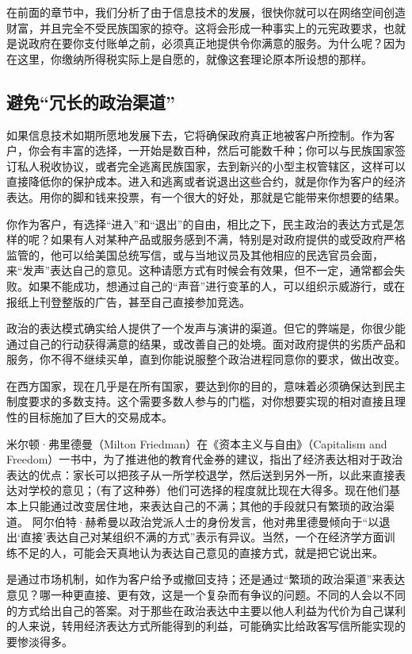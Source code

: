 在前面的章节中，我们分析了由于信息技术的发展，很快你就可以在网络空间创造财富，并且完全不受民族国家的掠夺。这将会形成一种事实上的元宪政要求，也就是说政府在要你支付账单之前，必须真正地提供令你满意的服务。为什么呢？因为在这里，你缴纳所得税实际上是自愿的，就像这套理论原本所设想的那样。

\subsection{避免“冗长的政治渠道”}
如果信息技术如期所愿地发展下去，它将确保政府真正地被客户所控制。作为客户，你会有丰富的选择，一开始是数百种，然后可能数千种；你可以与民族国家签订私人税收协议，或者完全逃离民族国家，去到新兴的小型主权管辖区，这样可以直接降低你的保护成本。进入和逃离或者说退出这些合约，就是你作为客户的经济表达。用你的脚和钱来投票，有一个很大的好处，那就是它能带来你想要的结果。

你作为客户，有选择“进入”和“退出”的自由，相比之下，民主政治的表达方式是怎样的呢？如果有人对某种产品或服务感到不满，特别是对政府提供的或受政府严格监管的，他可以给美国总统写信，或与当地议员及其他相应的民选官员会面，来“发声”表达自己的意见。这种请愿方式有时候会有效果，但不一定，通常都会失败。如果不能成功，想通过自己的“声音”进行变革的人，可以组织示威游行，或在报纸上刊登整版的广告，甚至自己直接参加竞选。

政治的表达模式确实给人提供了一个发声与演讲的渠道。但它的弊端是，你很少能通过自己的行动获得满意的结果，或改善自己的处境。面对政府提供的劣质产品和服务，你不得不继续买单，直到你能说服整个政治进程同意你的要求，做出改变。

在西方国家，现在几乎是在所有国家，要达到你的目的，意味着必须确保达到民主制度要求的多数支持。这个需要多数人参与的门槛，对你想要实现的相对直接且理性的目标施加了巨大的交易成本。

米尔顿·弗里德曼（Milton Friedman）在《资本主义与自由》（Capitalism and Freedom）一书中，为了推进他的教育代金券的建议，指出了经济表达相对于政治表达的优点：家长可以把孩子从一所学校退学，然后送到另外一所，以此来直接表达对学校的意见；（有了这种券）他们可选择的程度就比现在大得多。现在他们基本上只能通过改变居住地，来表达自己的不满；其他的手段就只有繁琐的政治渠道。 阿尔伯特·赫希曼以政治党派人士的身份发言，他对弗里德曼倾向于“以退出‘直接’表达自己对某组织不满的方式”表示有异议。当然，一个在经济学方面训练不足的人，可能会天真地认为表达自己意见的直接方式，就是把它说出来。

是通过市场机制，如作为客户给予或撤回支持；还是通过“繁琐的政治渠道”来表达意见？哪一种更直接、更有效，这是一个复杂而有争议的问题。不同的人会以不同的方式给出自己的答案。对于那些在政治表达中主要以他人利益为代价为自己谋利的人来说，转用经济表达方式所能得到的利益，可能确实比给政客写信所能实现的要惨淡得多。

